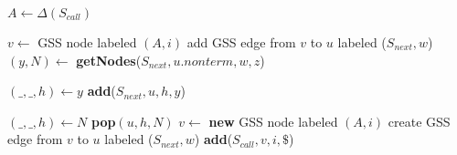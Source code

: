 \begin{algorithmic}    
    \State $A \gets \Delta(S_{call})$
    
        \State $v \gets$ GSS node labeled $(A, i)$
            \State add GSS edge from $v$ to $u$ labeled ($S_{next},w$)
                \State $(y,N) \gets$ \textbf{getNodes}($S_{next}, u.nonterm, w, z$)
                
                \State $(\_, \_, h) \gets y$
                \State \textbf{add}($S_{next} , u, h, y$)
                
                    \State $(\_, \_, h) \gets N$
                    \State \textbf{pop}$(u,h,N)$ 
                \EndIf
            \EndFor
        \EndIf
    \Else
        \State $v \gets$ \textbf{new} GSS node labeled $(A, i)$
        \State create GSS edge from $v$ to $u$ labeled ($S_{next}, w$)
        \State \textbf{add}($S_{call}, v, i, \$ $)
    \EndIf
\EndFunction
\end{algorithmic}  